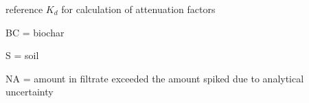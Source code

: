 \begin{sidewaystable}
{\begin{threeparttable}
\begin{tabular}{llllllllllllllllll}
\end{tabular}
\begin{tablenotes}
\item * reference $K_d$ for calculation of attenuation factors
\item BC = biochar
\item S = soil
\item NA = amount in filtrate exceeded the amount spiked due to analytical uncertainty
\end{tablenotes}
\end{threeparttable}}
\end{sidewaystable}